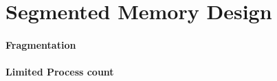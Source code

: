 \section{Segmented Memory Design}






\paragraph*{Fragmentation}
\paragraph*{Limited Process count}

